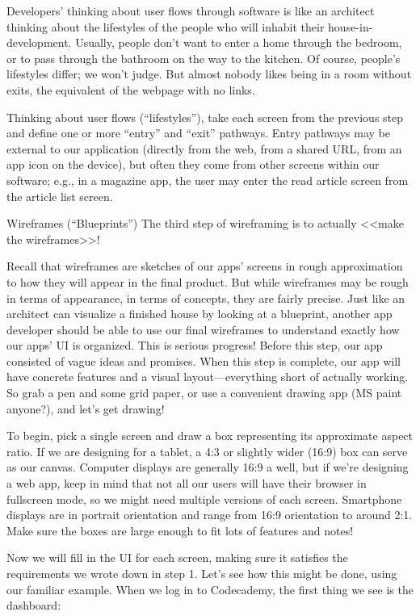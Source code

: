         Developers’ thinking about user flows through software is like an architect thinking about the lifestyles of the people who will inhabit their house-in-development. Usually, people don’t want to enter a home through the bedroom, or to pass through the bathroom on the way to the kitchen. Of course, people’s lifestyles differ; we won’t judge. But almost nobody likes being in a room without exits, the equivalent of the webpage with no links.

        Thinking about user flows (“lifestyles”), take each screen from the previous step and define one or more “entry” and “exit” pathways. Entry pathways may be external to our application (directly from the web, from a shared URL, from an app icon on the device), but often they come from other screens within our software; e.g., in a magazine app, the user may enter the read article screen from the article list screen.

    Wireframes (“Blueprints”)
        The third step of wireframing is to actually <<make the wireframes>>!

        Recall that wireframes are sketches of our apps’ screens in rough approximation to how they will appear in the final product. But while wireframes may be rough in terms of appearance, in terms of concepts, they are fairly precise. Just like an architect can visualize a finished house by looking at a blueprint, another app developer should be able to use our final wireframes to understand exactly how our apps’ UI is organized. This is serious progress! Before this step, our app consisted of vague ideas and promises. When this step is complete, our app will have concrete features and a visual layout—everything short of actually working. So grab a pen and some grid paper, or use a convenient drawing app (MS paint anyone?), and let’s get drawing!

        To begin, pick a single screen and draw a box representing its approximate aspect ratio. If we are designing for a tablet, a 4:3 or slightly wider (16:9) box can serve as our canvas. Computer displays are generally 16:9 a well, but if we’re designing a web app, keep in mind that not all our users will have their browser in fullscreen mode, so we might need multiple versions of each screen. Smartphone displays are in portrait orientation and range from 16:9 orientation to around 2:1. Make sure the boxes are large enough to fit lots of features and notes!

        Now we will fill in the UI for each screen, making sure it satisfies the requirements we wrote down in step 1. Let’s see how this might be done, using our familiar example. When we log in to Codecademy, the first thing we see is the dashboard:

